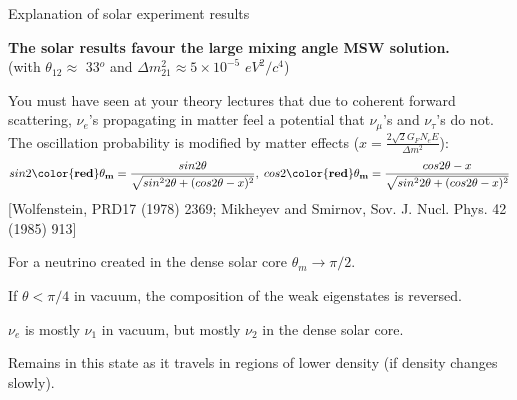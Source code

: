\begin{frame}[t]{Explanation of solar experiment results}

\begin{center}
{\bf The solar results favour the {\color{red}large mixing angle MSW solution}.}\\
(with $\theta_{12} \approx$ 33$^{o}$ and ${\Delta}m^{2}_{21} \approx 5\times 10^{-5}$ $eV^{2}/c^{4}$)\\
\end{center}
\begin{block}{}
{\small
\centering
You must have seen at your theory lectures that due to coherent forward scattering, $\nu_{e}$'s propagating in
matter feel a potential that $\nu_{\mu}$'s and $\nu_{\tau}$'s do not.\\
\vspace{0.2cm}
The oscillation probability is modified by matter effects ($x = \frac{2\sqrt{2}G_{F}N_{e}E}{{\Delta}m^{2}}$):
\[
  \displaystyle
  sin2{\bf \color{red}\theta_{m}} = \frac{sin2\theta}{\sqrt{sin^{2}2\theta + (cos2\theta-x)^{2}}},\;
  cos2{\bf \color{red}\theta_{m}} = \frac{cos2\theta-x}{\sqrt{sin^{2}2\theta + (cos2\theta-x)^{2}}}
\]
{
\scriptsize \color{blue}[Wolfenstein, PRD17 (1978) 2369; Mikheyev and Smirnov, Sov. J. Nucl. Phys. 42 (1985) 913]}
}
\end{block}

\begin{itemize}
{\scriptsize
\item For a neutrino created in the dense solar core $\theta_{m} \rightarrow \pi/2$.
\item If $\theta < \pi/4$ in vacuum, the composition of the weak eigenstates is reversed.
\item $\nu_{e}$ is mostly $\nu_{1}$ in vacuum, but mostly $\nu_{2}$ in the dense solar core.
\item Remains in this state as it travels in regions of lower density (if density changes slowly).\\
}
\end{itemize}


\end{frame}
